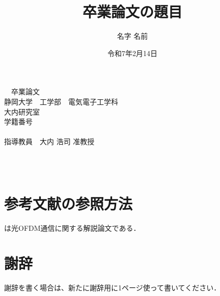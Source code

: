 \documentclass[fleqn, a4paper, titlepage, 11pt]{jsarticle}
\title{卒業論文の題目}
\date{令和7年2月14日}
\author{名字 名前}
\numberwithin{figure}{section}  %
\numberwithin{table}{section}  %
\numberwithin{equation}{section}  %
\begin{document}
\begin{titlepage}
  \begin{center}
    \vspace*{3.5cm}
    {\LARGE \thegraduateyear　卒業論文\\}
    \vspace{1cm}
    \textgt{\huge \thetitle\\}
    \vspace{4cm}
    {\LARGE
    静岡大学　工学部　電気電子工学科\\
    大内研究室\\
    学籍番号　\thestudentnumber\\
    \theauthor\\
    指導教員　大内 浩司 准教授\\
    }
    \vspace{2cm}
    {\LARGE \thedate\\}
  \end{center}
\end{titlepage}
\newpage
\thispagestyle{empty}
~\\
\newpage
\tableofcontents %
\setcounter{page}{1}  %
\newpage

\section{参考文献の参照方法}
\cite{ohuchi2019}は光OFDM通信に関する解説論文である．

\newpage
\section*{謝辞}
謝辞を書く場合は、新たに謝辞用に1ページ使って書いてください．

\newpage
\end{document}
